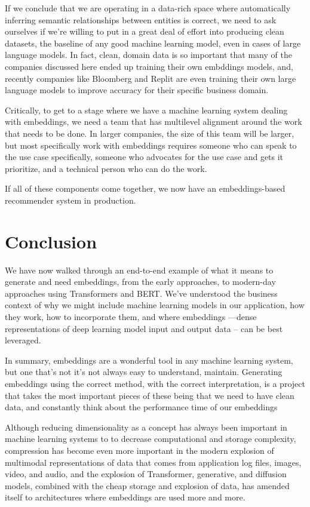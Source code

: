 \documentclass[11pt, table]{diazessay} %
\begin{document}
\begin{sloppypar}
If we conclude that we are operating in a data-rich space where automatically inferring semantic relationships between entities is correct, we need to ask ourselves if we're willing to put in a great deal of effort into producing clean datasets, the baseline of any good machine learning model, even in cases of large language models. In fact, clean, domain data is so important that many of the companies discussed here ended up training their own embddings models, and, recently companies like Bloomberg\citep{wu2023bloomberggpt} and Replit\citep{Shabani_2023} are even training their own large language models to improve accuracy for their specific business domain. 

Critically, to get to a stage where we have a machine learning system dealing with embeddings, we need a team that has multilevel alignment around the work that needs to be done. In larger companies, the size of this team will be larger, but most specifically work with embeddings requires someone who can speak to the use case specifically, someone who advocates for the use case and gets it prioritize, and a technical person who can do the work\citep{meil2023ai}.

If all of these components come together, we now have an embeddings-based recommender system in production. 


\section{Conclusion}

We have now walked through an end-to-end example of what it means to generate and need embeddings, from the early approaches, to modern-day approaches using Transformers and BERT. We've understood the business context of why we might include machine learning models in our application, how they work, how to incorporate them, and where embeddings ---dense representations of deep learning model input and output data -- can be best leveraged.  

In summary, embeddings are a wonderful tool in any machine learning system, but one that's not it's not always easy to understand, maintain. Generating embeddings using the correct method, with the correct interpretation, is a project that takes  the most important pieces of these being that we need to have clean data, and constantly think about the performance time of our embeddings

Although reducing dimensionality as a concept has always been important in machine learning systems to to decrease computational and storage complexity, compression has become even more important in the modern explosion of multimodal representations of data that comes from application log files, images, video, and audio, and the explosion of Transformer, generative, and diffusion models, combined with the cheap storage and explosion of data, has amended itself to architectures where embeddings are used more and more. 


\end{sloppypar}
\end{document}
